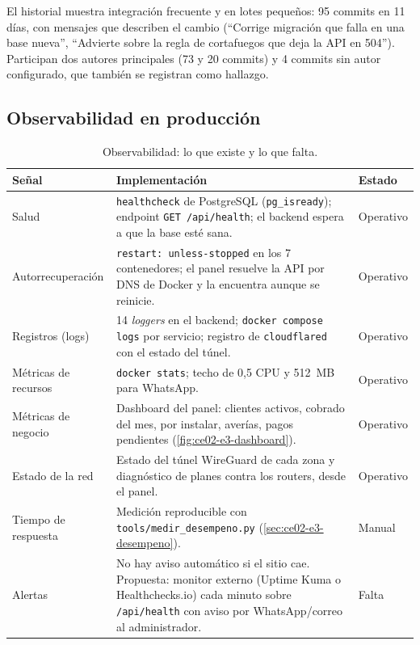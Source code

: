 El historial muestra integración frecuente y en lotes pequeños: 95 commits en 11 días, con
mensajes que describen el cambio (``Corrige migración que falla en una base nueva'',
``Advierte sobre la regla de cortafuegos que deja la API en 504''). Participan dos autores
principales (73 y 20 commits) y 4 commits sin autor configurado, que también se registran
como hallazgo.

\subsection{Observabilidad en producción}

\begin{table}[H]
\centering
\caption{Observabilidad: lo que existe y lo que falta.}
\label{tab:ce02-e4-observabilidad}
\small
\begin{tabularx}{\textwidth}{L{2.6cm}XL{1.8cm}}
\toprule
\textbf{Señal} & \textbf{Implementación} & \textbf{Estado} \\
\midrule
Salud & \texttt{healthcheck} de PostgreSQL (\texttt{pg\_isready}); endpoint \texttt{GET /api/health}; el backend espera a que la base esté sana. & Operativo \\
Autorrecuperación & \texttt{restart: unless-stopped} en los 7 contenedores; el panel resuelve la API por DNS de Docker y la encuentra aunque se reinicie. & Operativo \\
Registros (logs) & 14 \emph{loggers} en el backend; \texttt{docker compose logs} por servicio; registro de \texttt{cloudflared} con el estado del túnel. & Operativo \\
Métricas de recursos & \texttt{docker stats}; techo de 0,5 CPU y 512~MB para WhatsApp. & Operativo \\
Métricas de negocio & Dashboard del panel: clientes activos, cobrado del mes, por instalar, averías, pagos pendientes (\cref{fig:ce02-e3-dashboard}). & Operativo \\
Estado de la red & Estado del túnel WireGuard de cada zona y diagnóstico de planes contra los routers, desde el panel. & Operativo \\
Tiempo de respuesta & Medición reproducible con \texttt{tools/medir\_desempeno.py} (\cref{sec:ce02-e3-desempeno}). & Manual \\
Alertas & No hay aviso automático si el sitio cae. Propuesta: monitor externo (Uptime Kuma o Healthchecks.io) cada minuto sobre \texttt{/api/health} con aviso por WhatsApp/correo al administrador. & Falta \\
\bottomrule
\end{tabularx}
\end{table}

